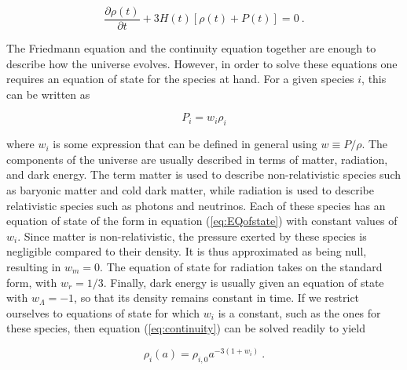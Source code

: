 \documentclass[10pt,letterpaper,final]{iopart}
\numberwithin{equation}{subsection}
\def\ni{\noindent}
\begin{document}
\begin{equation}\label{eq:continuity}
\frac{\partial \rho(t)}{\partial t} + 3H(t)\left[\rho(t) + P(t)\right] = 0 \ . 
\end{equation}

The Friedmann equation and the continuity equation together are enough to describe how the universe evolves. However, in order to solve these equations one requires an equation of state for the species at hand. For a given species $i$, this can be written as

\begin{equation}\label{eq:EQofstate}
P_i = w_i \rho_i
\end{equation}

\ni where $w_i$ is some expression that can be defined in general using $w \equiv P/\rho$. The components of the universe are usually described in terms of matter, radiation, and dark energy. The term matter is used to describe non-relativistic species such as baryonic matter and cold dark matter, while radiation is used to describe relativistic species such as photons and neutrinos. Each of these species has an equation of state of the form in equation (\ref{eq:EQofstate}) with constant values of $w_i$. Since matter is non-relativistic, the pressure exerted by these species is negligible compared to their density. It is thus approximated as being null, resulting in $w_m = 0$. The equation of state for radiation takes on the standard form, with $w_r = 1/3$. Finally, dark energy is usually given an equation of state with  $w_\Lambda = -1$, so that its density remains constant in time. If we restrict ourselves to equations of state for which $w_i$ is a constant, such as the ones for these species, then equation (\ref{eq:continuity}) can be solved readily to yield

\begin{equation}\label{eq:rho_sol}
\rho_i(a) = \rho_{i,0} a^{-3(1+w_i)} \ .
\end{equation}
\end{document}
